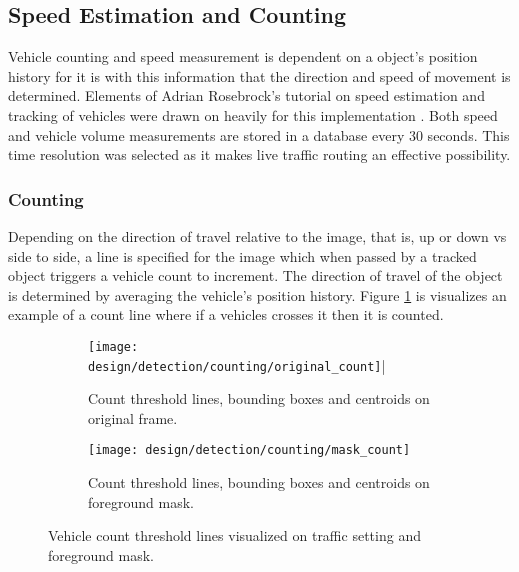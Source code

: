\subsection{Speed Estimation and Counting}
\label{subsection:count_measure}

Vehicle counting and speed measurement is dependent on a object's position history for it is with this information that the direction and speed of movement is determined. Elements of Adrian Rosebrock's tutorial on speed estimation and tracking of vehicles were drawn on heavily for this implementation \cite{adrian_rosebrock_vehicle_tracking}. Both speed and vehicle volume measurements are stored in a database every 30 seconds. This time resolution was selected as it makes live traffic routing an effective possibility. 

\subsubsection{Counting}

Depending on the direction of travel relative to the image, that is, up or down vs side to side, a line is specified for the image which when passed by a tracked object triggers a vehicle count to increment. The direction of travel of the object is determined by averaging the vehicle's position history. Figure \ref{fig:count_lines} is visualizes an example of a count line where if a vehicles crosses it then it is counted. 

\begin{figure}[H]
	\centering
	\begin{subfigure}[b]{0.42\textwidth}
            \centering\texttt{[image: design/detection/counting/original\_count]}|
            \captionsetup{format = hang}  
      		\caption{Count threshold lines, bounding boxes and centroids on original frame.}
    	\end{subfigure}
    	\begin{subfigure}[b]{0.42\textwidth}
      		\centering\texttt{[image: design/detection/counting/mask\_count]}
            \captionsetup{format = hang}    
            \caption{Count threshold lines, bounding boxes and centroids on foreground mask.}
        \end{subfigure}
        \captionsetup{format = hang}
    	\caption{Vehicle count threshold lines visualized on traffic setting and foreground mask.}
    	\label{fig:count_lines}
\end{figure}


